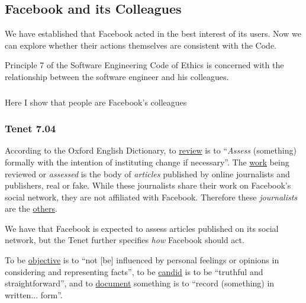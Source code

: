 
\subsection{Facebook and its Colleagues}

\par We have established that Facebook acted in the best interest of its users. Now we can explore whether their actions themselves are consistent with the Code.

\par Principle 7 of the Software Engineering Code of Ethics is concerned with the relationship between the software engineer and his colleagues. \cite{se_code} 

\subsubsection{}

\par Here I show that people are Facebook's colleagues

\subsubsection{Tenet 7.04}


\par According to the Oxford English Dictionary, to \ul{review} is to ``\emph{Assess} (something) formally with the intention of instituting change if necessary''. \cite{oxford} The \ul{work} being reviewed or \emph{assessed} is the body of \emph{articles} published by online journalists and publishers, real or fake. While these journalists share their work on Facebook's social network, they are not affiliated with Facebook. Therefore these \emph{journalists} are the \ul{others}.

\par We have that Facebook is expected to assess articles published on its social network, but the Tenet further specifies \emph{how} Facebook should act. 

\par To be \ul{objective} is to ``not [be] influenced by personal feelings or opinions in considering and representing facts'', \cite{oxford} to be \ul{candid} is to be ``truthful and straightforward'', \cite{oxford} and to \ul{document} something is to ``record (something) in written... form''. \cite{oxford}


